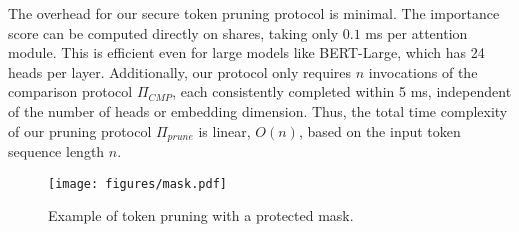 The overhead for our secure token pruning protocol is minimal. The importance score can be computed directly on shares, taking only $0.1$ ms per attention module. This is efficient even for large models like BERT-Large, which has 24 heads per layer. Additionally, our protocol only requires $n$ invocations of the comparison protocol $\Pi_{CMP}$, each consistently completed within 5 ms, independent of the number of heads or embedding dimension. Thus, the total time complexity of our pruning protocol $\Pi_{prune}$ is linear, $O(n)$, based on the input token sequence length $n$.


\begin{figure*}[h]
    \vspace{-0.1in}
    \centering
    \texttt{[image: figures/mask.pdf]}
    \captionsetup{skip=2pt}
    \caption{Example of token pruning with a protected mask.} %
    \label{fig:mask}
\end{figure*}

